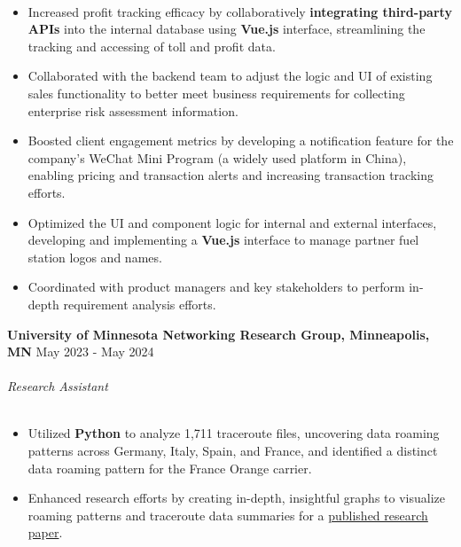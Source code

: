 \documentclass{cv}
\newcommand*{\labelfont}{\fontfamily{bch}\selectfont}
\begin{document}
\vspace{-27pt}\\
{
\small
\begin{itemize}
\setlength\itemsep{-2.5pt}
    \item Increased profit tracking efficacy by collaboratively \textbf{integrating third-party APIs} into the internal database using \textbf{Vue.js} interface, streamlining the tracking and accessing of toll and profit data.
    \item Collaborated with the backend team to adjust the logic and UI of existing sales functionality to better meet business requirements for collecting enterprise risk assessment information.
    \item Boosted client engagement metrics by developing a notification feature for the company’s WeChat Mini Program (a widely used platform in China), enabling pricing and transaction alerts and increasing transaction tracking efforts.
    \item Optimized the UI and component logic for internal and external interfaces, developing and implementing a \textbf{Vue.js} interface to manage partner fuel station logos and names.
    \item Coordinated with product managers and key stakeholders to perform in-depth requirement analysis efforts.
\end{itemize}
}
{\labelfont \textbf{University of Minnesota Networking Research Group, Minneapolis, MN}  \hspace{1.5mm}\hspace{2.3cm} May 2023 - May 2024}\\
\vspace{-11pt}\\
{\labelfont \textit{Research Assistant} }\\
\vspace{-27pt}\\
{
\small
\begin{itemize}
\setlength\itemsep{-2.5pt}
    \item Utilized \textbf{Python} to analyze 1,711 traceroute files, uncovering data roaming patterns across Germany, Italy, Spain, and France, and identified a distinct data roaming pattern for the France Orange carrier.
    \item Enhanced research efforts by creating in-depth, insightful graphs to visualize roaming patterns and traceroute data summaries for a \href{https://ieeexplore.ieee.org/document/10621234}{published research paper}.
\end{itemize}
}
\end{document}
